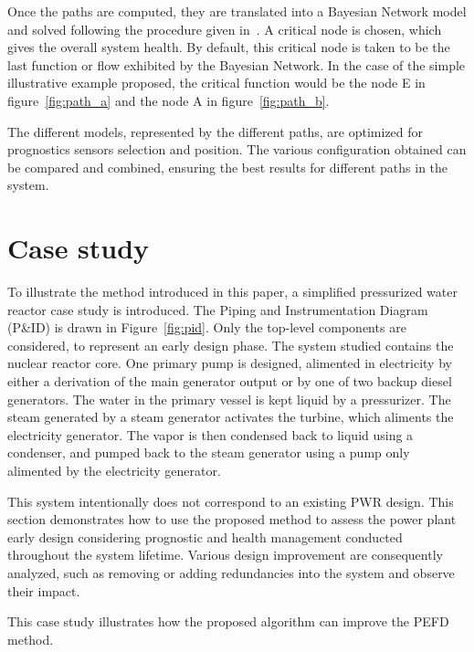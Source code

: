 Once the paths are computed, they are translated into a Bayesian Network model and solved following the procedure given in~\cite{lher2016}. A critical node is chosen, which gives the overall system health. By default, this critical node is taken to be the last function or flow exhibited by the Bayesian Network. In the case of the simple illustrative example proposed, the critical function would be the node E in figure~\ref{fig:path_a} and the node A in figure~\ref{fig:path_b}.

The different models, represented by the different paths, are optimized for prognostics sensors selection and position. The various configuration obtained can be compared and combined, ensuring the best results for different paths in the system.

\section{Case study}

To illustrate the method introduced in this paper, a simplified pressurized water reactor case study is introduced. The Piping and Instrumentation Diagram (P\&ID) is drawn in Figure~\ref{fig:pid}. Only the top-level components are considered, to represent an early design phase. The system studied contains the nuclear reactor core. One primary pump is designed, alimented in electricity by either a derivation of the main generator output or by one of two backup diesel generators. The water in the primary vessel is kept liquid by a pressurizer. The steam generated by a steam generator activates the turbine, which aliments the electricity generator. The vapor is then condensed back to liquid using a condenser, and pumped back to the steam generator using a pump only alimented by the electricity generator.

This system intentionally does not correspond to an existing PWR design. This section demonstrates how to use the proposed method to assess the power plant early design considering prognostic and health management conducted throughout the system lifetime. Various design improvement are consequently analyzed, such as removing or adding redundancies into the system and observe their impact.

This case study illustrates how the proposed algorithm can improve the PEFD method.


